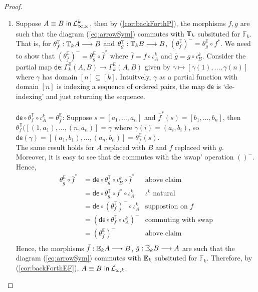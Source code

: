 \begin{prop}
\begin{proof}
\begin{enumerate}[label=(\arabic*)]
\item Suppose ${A \equiv B \ \mathsf{in}\: \mathcal{L}^{k}_{\infty,\omega}}$, then by (\ref{cor:backForthP}), the morphisms $f,g$ are such that the diagram (\ref{eq:arrowSym}) commutes with ${\mathbb{T}_{k}}$ subsituted for $\mathbb{F}_{k}$. That is, for $\theta^{\mathbb{T}}_{f}:{\mathbb{T}_{k}A} \longrightarrow B$ and $\theta^{\mathbb{T}}_{g}:{\mathbb{T}_{k}B} \longrightarrow B$, $(\theta^{\mathbb{T}}_{f})^{-} = \theta^{\mathbb{T}}_{g} \circ f^{*}$. We need to show that $(\theta^{\mathbb{E}}_{\bar{f}})^{-} = \theta^{\mathbb{E}}_{\bar{g}} \circ \bar{f}^{*}$ where $\bar{f} = f \circ \iota^{k}_{A}$ and $\bar{g} = g \circ \iota^{k}_{B}$. Consider the partial map $\mathsf{de}:\Gamma^{\mathbb{T}}_{k}(A,B) \longrightarrow \Gamma^{\mathbb{E}}_{k}(A,B)$ given by $\gamma \mapsto [\gamma(1),\dots,\gamma(n)]$ where $\gamma$ has domain $[n] \subseteq [k]$. Intuitvely, $\gamma$ as a partial function with domain $[n]$ is indexing a sequence of ordered pairs, the map $\mathsf{de}$ is `de-indexing' and just returning the sequence. \\~\\
$\mathsf{de} \circ \theta^{\mathbb{T}}_{f} \circ \iota^{k}_{A} = \theta^{\mathbb{E}}_{\bar{f}}$: Suppose $s = [a_{1},\dots,a_{n}]$ and $\bar{f}^{*}(s) = [b_{1},\dots,b_{n}]$, then $\theta^{\mathbb{T}}_{f}([(1,a_{1}),\dots,(n,a_{n})] = \gamma$ where $\gamma(i) = (a_{i},b_{i})$, so $\mathsf{de}(\gamma) = [(a_{1},b_{1}),\dots,(a_{n},b_{n})] = \theta^{\mathbb{E}}_{\bar{f}}(s)$.  \\ 
The same result holds for $A$ replaced with $B$ and $f$ replaced with $g$. Moreover, it is easy to see that $\mathsf{de}$ commutes with the `swap' operation $()^{-}$. Hence,
\begin{align*}
\theta_{\bar{g}}^{\mathbb{E}} \circ \bar{f}^{*}  &= \mathsf{de} \circ \theta_{g}^{\mathbb{T}} \circ \iota^{k}_{B} \circ \bar{f}^{*} & \text{above claim} \\
&= \mathsf{de} \circ \theta_{g}^{\mathbb{T}} \circ f^{*} \circ \iota^{k}_{A} & \text{$\iota^{k}$ natural} \\
&= \mathsf{de} \circ (\theta_{f}^{\mathbb{T}})^{-} \circ \iota^{k}_{A} & \text{suppostion on $f$} \\
&= (\mathsf{de} \circ \theta_{f}^{\mathbb{T}} \circ \iota^{k}_{A})^{-} & \text{commuting with swap} \\
&= (\theta_{\bar{f}}^{\mathbb{E}})^{-} & \text{above claim} \\
\end{align*}
Hence, the morphisms $\bar{f}:{\mathbb{E}_{k}A} \longrightarrow B$, $\bar{g}:{\mathbb{E}_{k}B} \longrightarrow A$ are such that the diagram (\ref{eq:arrowSym}) commutes with ${\mathbb{E}_{k}}$ subsituted for $\mathbb{F}_{k}$. Therefore, by (\ref{cor:backForthEF}), ${A \equiv B \ \mathsf{in}\: \mathcal{L}_{\omega,k}}$.

\end{enumerate}
\end{proof}
\end{prop}
